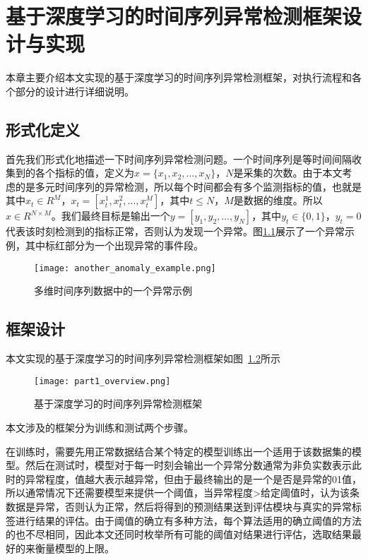 
\chapter{基于深度学习的时间序列异常检测框架设计与实现}
\label{cha:anomaly:detection}
本章主要介绍本文实现的基于深度学习的时间序列异常检测框架，对执行流程和各个部分的设计进行详细说明。
\section{形式化定义}
首先我们形式化地描述一下时间序列异常检测问题。一个时间序列是等时间间隔收集到的各个指标的值，定义为$x=\{x_1,x_2,\dots,x_N\}$，$N$是采集的次数。由于本文考虑的是多元时间序列的异常检测，所以每个时间都会有多个监测指标的值，也就是其中$x_t\in R^M$，$x_t=[x_t^1,x_t^2,\dots,x_t^M]$，其中$t\leq N$，$M$是数据的维度。所以$x\in R^{N\times M}$。我们最终目标是输出一个$y=[y_1, y_2,\dots, y_N ]$，其中$y_t\in \{0,1\}$，$y_t=0$代表该时刻检测到的指标正常，否则认为发现一个异常。图\ref{fig:anomaly_example}展示了一个异常示例，其中标红部分为一个出现异常的事件段。
\begin{figure}[htbp]
  \centering
  \texttt{[image: another\_anomaly\_example.png]}
  \caption{多维时间序列数据中的一个异常示例}
  \label{fig:anomaly_example}
\end{figure}

\section{框架设计}
本文实现的基于深度学习的时间序列异常检测框架如图~\ref{fig:part1_overview}所示

\begin{figure}[htbp]
    \centering
    \texttt{[image: part1\_overview.png]}
    \caption{基于深度学习的时间序列异常检测框架}
    \label{fig:part1_overview}
  \end{figure}

本文涉及的框架分为训练和测试两个步骤。

在训练时，需要先用正常数据结合某个特定的模型训练出一个适用于该数据集的模型。然后在测试时，模型对于每一时刻会输出一个异常分数通常为非负实数表示此时的异常程度，值越大表示越异常，但由于最终输出的是一个是否是异常的01值，所以通常情况下还需要模型来提供一个阈值，当异常程度>给定阈值时，认为该条数据是异常，否则认为正常，然后将得到的预测结果送到评估模块与真实的异常标签进行结果的评估。由于阈值的确立有多种方法，每个算法适用的确立阈值的方法的也不尽相同，因此本文还同时枚举所有可能的阈值对结果进行评估，选取结果最好的来衡量模型的上限\cite{xu2018unsupervised,su2019robust,DBLP:conf/ipccc/LiCP18,DBLP:conf/infocom/ChenXLPCQFW19}。

